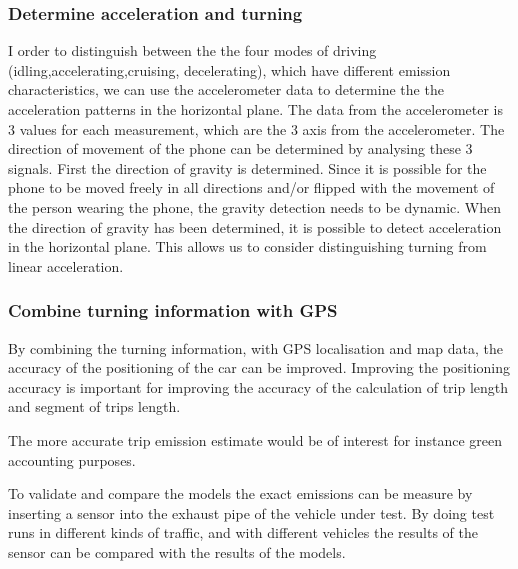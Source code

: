 \subsubsection{Determine acceleration and turning}
I order to distinguish between the the four modes of driving (idling,accelerating,cruising, decelerating), which have different emission characteristics, we can use the accelerometer data to determine the the acceleration patterns in the horizontal plane.
The data from the accelerometer is 3 values for each measurement, which are the 3 axis from the accelerometer. The direction of movement of the phone can be determined by analysing these 3 signals. First the direction of gravity is determined. Since it is possible for the phone to be moved freely in all directions and/or flipped with the movement of the person wearing the phone, the gravity detection needs to be dynamic. When the direction of gravity has been determined, it is possible to detect acceleration in the horizontal plane. This allows us to consider distinguishing turning from linear acceleration.

\subsubsection{Combine turning information with GPS }

By combining the turning information, with GPS localisation and map data, the accuracy of the positioning of the car can be improved. Improving the positioning accuracy is important for improving the accuracy of the calculation of trip length and segment of trips length.


The more accurate trip emission estimate would be of interest for instance green accounting purposes.

To validate and compare the models the exact emissions can be measure by inserting a sensor into the exhaust pipe of the vehicle under test. By doing test runs in different kinds of traffic, and with different vehicles the results of the sensor can be compared with the results of the models.